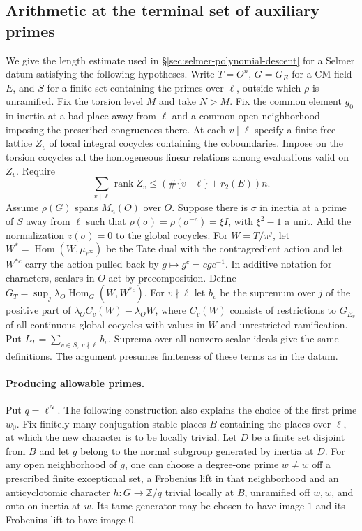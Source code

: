 \subsection{Arithmetic at the terminal set of auxiliary primes}
\label{sec:terminal-selmer}
We give the length estimate used in \S\ref{sec:selmer-polynomial-descent}
for a Selmer datum satisfying the following hypotheses. Write $T=O^n$,
$G=G_E$ for a CM field $E$, and $S$ for a finite set containing the primes over $\ell$, outside which $\rho$ is unramified. Fix the torsion level $M$ and take $N>M$. Fix the common element $g_0$ in inertia at a bad place away from $\ell$ and a common open neighborhood imposing the prescribed congruences there. At each $v\mid\ell$
specify a finite free lattice $Z_v$ of local integral cocycles containing
the coboundaries. Impose on the torsion cocycles all the homogeneous
linear relations among evaluations valid on $Z_v$. Require
\[
 \sum_{v\mid\ell}\operatorname{rank} Z_v
 \leq (\#\{v\mid\ell\}+r_2(E))n .
\]
Assume $\rho(G)$ spans $M_n(O)$ over $O$. Suppose there is
$\sigma$ in inertia at a prime of $S$ away from $\ell$ such that
$\rho(\sigma)=\rho(\sigma^{-c})=\xi I$, with $\xi^2-1$ a unit.
Add the normalization $z(\sigma)=0$ to the global cocycles.
For $W=T/\pi^j$, let $W^*=\operatorname{Hom}(W,\mu_{\ell^\infty})$
be the Tate dual with the contragredient action and let $W^{*c}$ carry
the action pulled back by $g\mapsto g^c=cgc^{-1}$. In additive
notation for characters, scalars in $O$ act by precomposition.
Define $G_T=\sup_j\lambda_O\operatorname{Hom}_G(W,W^{*c})$.
For $v\nmid\ell$ let $b_v$ be the supremum over $j$ of the positive
part of $\lambda_O C_v(W)-\lambda_O W$, where $C_v(W)$ consists of
restrictions to $G_{E_v}$ of all continuous global cocycles with values
in $W$ and unrestricted ramification. Put $L_T=\sum_{v\in S,\ v\nmid\ell} b_v$.
Suprema over all nonzero scalar ideals give the same definitions.
The argument presumes finiteness of these terms as in the datum.

\paragraph{Producing allowable primes.}
Put $q=\ell^N$. The following construction also explains the choice of
the first prime $w_0$. Fix finitely many conjugation-stable places $B$
containing the places over $\ell$, at which the new character is to be
locally trivial. Let $D$ be a finite set disjoint from $B$ and let
$g$ belong to the normal subgroup generated by inertia at $D$. For any open
neighborhood of $g$, one can choose a degree-one prime $w\ne\bar w$ off a
prescribed finite exceptional set, a Frobenius lift in that neighborhood
and an anticyclotomic character $h:G\to\mathbb Z/q$ trivial locally at $B$,
unramified off $w,\bar w$, and onto on inertia at $w$. Its tame generator
may be chosen to have image $1$ and its Frobenius lift to have image $0$.

